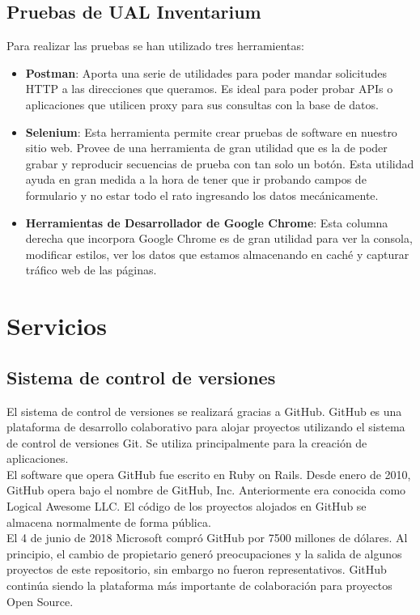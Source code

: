 \subsection{Pruebas de UAL Inventarium}
Para realizar las pruebas se han utilizado tres herramientas:
\begin{itemize}
    \item \textbf{Postman}: Aporta una serie de utilidades para poder mandar solicitudes HTTP a las direcciones que queramos. Es ideal para poder probar APIs o aplicaciones que utilicen proxy para sus consultas con la base de datos.
    \item \textbf{Selenium}: Esta herramienta permite crear pruebas de software en nuestro sitio web. Provee de una herramienta de gran utilidad que es la de poder grabar y reproducir secuencias de prueba con tan solo un botón. Esta utilidad ayuda en gran medida a la hora de tener que ir probando campos de formulario y no estar todo el rato ingresando los datos mecánicamente.
    \item \textbf{Herramientas de Desarrollador de Google Chrome}: Esta columna derecha que incorpora Google Chrome es de gran utilidad para ver la consola, modificar estilos, ver los datos que estamos almacenando en caché y capturar tráfico web de las páginas.
\end{itemize}

\section{Servicios}

\subsection{Sistema de control de versiones}
El sistema de control de versiones se realizará gracias a GitHub. GitHub es una plataforma de desarrollo colaborativo para alojar proyectos utilizando el sistema de control de versiones Git. Se utiliza principalmente para la creación de aplicaciones.
\\El software que opera GitHub fue escrito en Ruby on Rails. Desde enero de 2010, GitHub opera bajo el nombre de GitHub, Inc. Anteriormente era conocida como Logical Awesome LLC. El código de los proyectos alojados en GitHub se almacena normalmente de forma pública.
\\El 4 de junio de 2018 Microsoft compró GitHub por 7500 millones de dólares. Al principio, el cambio de propietario generó preocupaciones y la salida de algunos proyectos de este repositorio, sin embargo no fueron representativos. GitHub continúa siendo la plataforma más importante de colaboración para proyectos Open Source.

